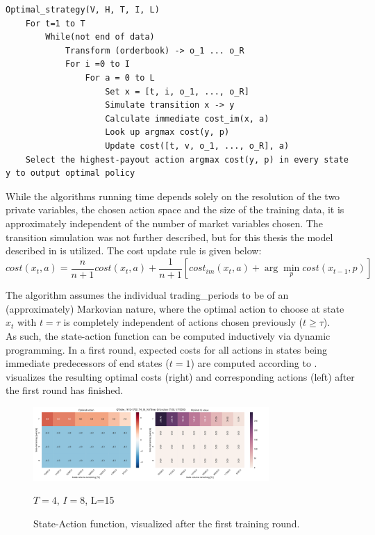 \begin{lstlisting}[frame=single, breaklines=true, basicstyle=\scriptsize, caption=Brute-Force strategy learning approach as described in \Cite{Nevmyvaka:2006}., label=lst:bruteforce:pseudocode]
Optimal_strategy(V, H, T, I, L)
    For t=1 to T
        While(not end of data)
            Transform (orderbook) -> o_1 ... o_R
            For i =0 to I
                For a = 0 to L
                    Set x = [t, i, o_1, ..., o_R]
                    Simulate transition x -> y
                    Calculate immediate cost_im(x, a)
                    Look up argmax cost(y, p)
                    Update cost([t, v, o_1, ..., o_R], a)
    Select the highest-payout action argmax cost(y, p) in every state y to output optimal policy
\end{lstlisting}

While the algorithms running time depends solely on the resolution of the two private variables, the chosen action space and the size of the training data, it is approximately independent of the number of market variables chosen. The transition simulation was not further described, but for this thesis the model described in  is utilized. The cost update rule is given below: 
\begin{equation}\label{eq:costfunction}
   cost(x_t, a) = \dfrac{n}{n+1} cost(x_t, a) + \dfrac{1}{n+1} [cost_{im}(x_t,a) + \arg\min_{p}cost(x_{t-1}, p)]
\end{equation}

The algorithm assumes the individual trading\_periods to be of an (approximately) Markovian nature, where the optimal action to choose at state $x_t$ with $t = \tau$ is completely independent of actions chosen previously ($t \geq \tau$).\\

As such, the state-action function can be computed inductively via dynamic programming. In a first round, expected costs for all actions in states being immediate predecessors of end states (\ie $t=1$) are computed according to .  visualizes the resulting optimal costs (right) and corresponding actions (left) after the first round has finished.

\begin{figure}[ht]
	\centering
   \includegraphics[width=0.8\textwidth]{content/drawings/heatmap_3months_t1}
	\caption{State-Action function, visualized after the first training round.}
	$T=4$, $I=8$, L=15
	\label{fig:heatmap:t1}
\end{figure}

